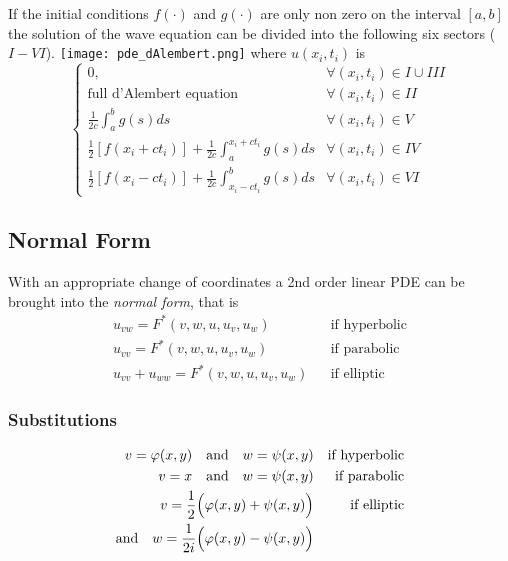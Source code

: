 If the initial conditions $f(\cdot)$ and $g(\cdot)$ are only non zero on the interval $[a,b]$ the solution of the wave equation can be divided into the following six sectors ($I-VI$).
\texttt{[image: pde\_dAlembert.png]}
where $u(x_i,t_i)$ is
\begin{equation*}
    \begin{cases}
        0,                                                                        & \forall (x_i,t_i) \in I \cup III \\
        \text{full d'Alembert equation}                                           & \forall (x_i,t_i) \in II         \\
        \frac{1}{2c}\int_{a}^{b}g(s)ds                                            & \forall (x_i,t_i) \in V          \\
        \frac{1}{2}\left[f(x_i+ct_i)\right]+\frac{1}{2c}\int_{a}^{x_i+ct_i}g(s)ds & \forall (x_i,t_i) \in IV         \\
        \frac{1}{2}\left[f(x_i-ct_i)\right]+\frac{1}{2c}\int_{x_i-ct_i}^{b}g(s)ds & \forall (x_i,t_i) \in VI
    \end{cases}
\end{equation*}


\subsection{Normal Form}
With an appropriate change of coordinates a 2nd order linear PDE can be brought into the \textit{normal form}, that is
\begin{align*}
    u_{vw}=F^{*}(v,w,u,u_{v},u_{w})        &  & \text{if hyperbolic} \\
    u_{vv}=F^{*}(v,w,u,u_{v},u_{w})        &  & \text{if parabolic}  \\
    u_{vv}+u_{ww}=F^{*}(v,w,u,u_{v},u_{w}) &  & \text{if elliptic}
\end{align*}

\subsubsection{Substitutions}
\noindent
\begin{align*}
    v=\varphi(x,y)\quad\text{and}\quad w=\psi(x,y)                   &   & \text{if hyperbolic} \\
    v=x\quad\text{and}\quad w=\psi(x,y)                              &   & \text{if parabolic}  \\
    v=\frac{1}{2}\Bigl(\varphi(x,y)+\psi(x,y)\Bigr)                  &   & \text{if elliptic}   \\
    \text{and}\quad w=\frac{1}{2i}\Bigl(\varphi(x,y)-\psi(x,y)\Bigr) &
\end{align*}

